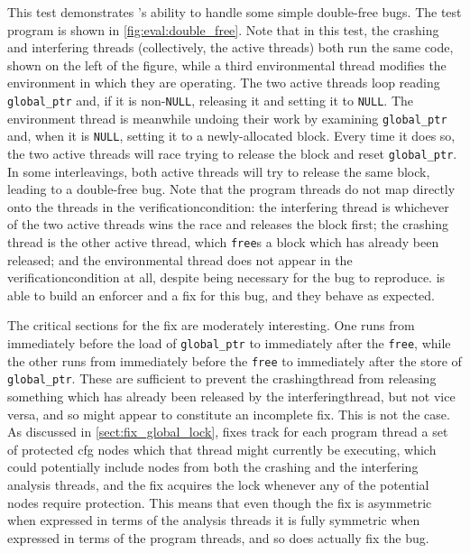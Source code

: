 This test demonstrates {\technique}'s ability to handle some simple
double-free bugs.  The test program is shown in
\autoref{fig:eval:double_free}.  Note that in this test, the crashing
and interfering threads (collectively, the active threads) both run
the same code, shown on the left of the figure, while a third
environmental thread modifies the environment in which they are
operating.  The two active threads loop reading \texttt{global\_ptr}
and, if it is non-\texttt{NULL}, releasing it and setting it to
\texttt{NULL}.  The environment thread is meanwhile undoing their work
by examining \texttt{global\_ptr} and, when it is \texttt{NULL},
setting it to a newly-allocated block.  Every time it does so, the two
active threads will race trying to release the block and reset
\texttt{global\_ptr}.  In some interleavings, both active threads will
try to release the same block, leading to a double-free bug.  Note
that the program threads do not map directly onto the threads in the
\gls{verificationcondition}: the interfering thread is whichever of
the two active threads wins the race and releases the block first; the
crashing thread is the other active thread, which \texttt{free}s a
block which has already been released; and the environmental thread
does not appear in the \gls{verificationcondition} at all, despite
being necessary for the bug to reproduce.  {\Implementation} is able
to build an enforcer and a fix for this bug, and they behave as
expected.

The critical sections for the fix are moderately interesting.  One
runs from immediately before the load of \texttt{global\_ptr} to
immediately after the \texttt{free}, while the other runs from
immediately before the \texttt{free} to immediately after the store of
\texttt{global\_ptr}.  These are sufficient to prevent the
\gls{crashingthread} from releasing something which has already been
released by the \gls{interferingthread}, but not vice versa, and so
might appear to constitute an incomplete fix.  This is not the case.
As discussed in \autoref{sect:fix_global_lock}, {\technique} fixes
track for each program thread a set of protected \gls{cfg} nodes which
that thread might currently be executing, which could potentially
include nodes from both the crashing and the interfering analysis
threads, and the fix acquires the lock whenever any of the potential
nodes require protection.  This means that even though the fix is
asymmetric when expressed in terms of the analysis threads it is fully
symmetric when expressed in terms of the program threads, and so does
actually fix the bug.

